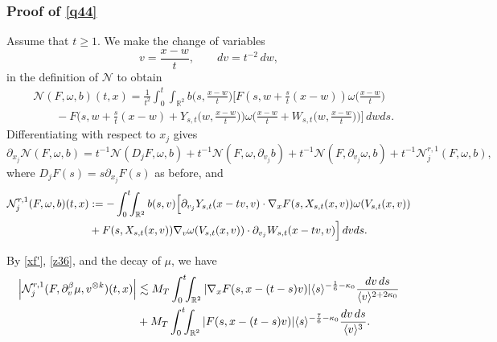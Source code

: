 \documentclass[reqno,11pt]{amsart}
\numberwithin{equation}{section}
\begin{document}
\subsubsection{Proof of \eqref{q44}} Assume that $t\geq1$. We make the change of variables
\[
v=\frac{x-w}{t},\qquad dv=t^{-2}\,dw,
\]
in the definition of $\mathcal N$ to obtain
\begin{equation}\label{z51}
\begin{split}
&\mathcal N(F,\omega,b)(t,x)
=\frac1{t^2}\int_0^t\!\!\int_{\mathbb R^2}
b\Big(s,\frac{x-w}{t}\Big)
\Big[F\left(s,w+\frac{s}{t}(x-w)\right)
\omega\Big(\frac{x-w}{t}\Big)\\
&\qquad-F\Big(s,w+\frac{s}{t}(x-w)
+Y_{s,t}\Big(w,\frac{x-w}{t}\Big)\Big)\omega\Big(\frac{x-w}{t}
+W_{s,t}\Big(w,\frac{x-w}{t}\Big)\Big)\Big]\,dwds.
\end{split}
\end{equation}
Differentiating with respect to $x_j$ gives
\begin{equation}\label{z60}
\partial_{x_j}\mathcal N(F,\omega,b)=t^{-1}\mathcal N(D_jF,\omega,b)
+t^{-1}\mathcal N(F,\omega,\partial_{v_j}b)
+t^{-1}\mathcal N(F,\partial_{v_j}\omega,b)+t^{-1}\mathcal N_j^{r,1}(F,\omega,b),
\end{equation}
where $D_jF(s)=s\partial_{x_j}F(s)$ as before, and
\begin{align}
\mathcal N_j^{r,1}(F,\omega,b)(t,x)
&:=-\int_0^t\!\!\int_{\mathbb R^2}b(s,v)
\Big[
\partial_{v_j}Y_{s,t}(x-tv,v)\cdot
\nabla_xF(s,X_{s,t}(x,v))\omega(V_{s,t}(x,v))
\notag\\
&+F(s,X_{s,t}(x,v))
\nabla_v\omega(V_{s,t}(x,v))\cdot
\partial_{v_j}W_{s,t}(x-tv,v)
\Big]\,dvds.
\label{z61}
\end{align}

By \eqref{xf'}, \eqref{z36}, and the decay of $\mu$, we have
\begin{align}
\left|\mathcal N_j^{r,1}
(F,\partial_v^\beta\mu,v^{\otimes k})(t,x)\right|&\lesssim
M_T\int_0^t\!\!\int_{\mathbb R^2}
|\nabla_xF(s,x-(t-s)v)|
\langle s\rangle^{-\frac16-\kappa_0}
\frac{dv\,ds}{\langle v\rangle^{2+2\kappa_0}}
\notag\\
&+M_T\int_0^t\!\!\int_{\mathbb R^2}
|F(s,x-(t-s)v)|
\langle s\rangle^{-\frac76-\kappa_0}
\frac{dv\,ds}{\langle v\rangle^3}.
\label{x104}
\end{align}
\end{document}
